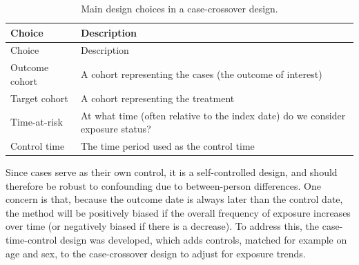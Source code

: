 \documentclass[11pt]{book}
\theoremstyle{definition}
\theoremstyle{definition}
\theoremstyle{definition}
\theoremstyle{remark}
\begin{document}
\begin{longtable}[]{@{}ll@{}}
\caption{\label{tab:ccrChoices} Main design choices in a case-crossover design.}\tabularnewline
\toprule
\begin{minipage}[b]{0.23\columnwidth}\raggedright
Choice\strut
\end{minipage} & \begin{minipage}[b]{0.72\columnwidth}\raggedright
Description\strut
\end{minipage}\tabularnewline
\midrule
\endfirsthead
\toprule
\begin{minipage}[b]{0.23\columnwidth}\raggedright
Choice\strut
\end{minipage} & \begin{minipage}[b]{0.72\columnwidth}\raggedright
Description\strut
\end{minipage}\tabularnewline
\midrule
\endhead
\begin{minipage}[t]{0.23\columnwidth}\raggedright
Outcome cohort\strut
\end{minipage} & \begin{minipage}[t]{0.72\columnwidth}\raggedright
A cohort representing the cases (the outcome of interest)\strut
\end{minipage}\tabularnewline
\begin{minipage}[t]{0.23\columnwidth}\raggedright
Target cohort\strut
\end{minipage} & \begin{minipage}[t]{0.72\columnwidth}\raggedright
A cohort representing the treatment\strut
\end{minipage}\tabularnewline
\begin{minipage}[t]{0.23\columnwidth}\raggedright
Time-at-risk\strut
\end{minipage} & \begin{minipage}[t]{0.72\columnwidth}\raggedright
At what time (often relative to the index date) do we consider exposure status?\strut
\end{minipage}\tabularnewline
\begin{minipage}[t]{0.23\columnwidth}\raggedright
Control time\strut
\end{minipage} & \begin{minipage}[t]{0.72\columnwidth}\raggedright
The time period used as the control time\strut
\end{minipage}\tabularnewline
\bottomrule
\end{longtable}

Since cases serve as their own control, it is a self-controlled design, and should therefore be robust to confounding due to between-person differences. One concern is that, because the outcome date is always later than the control date, the method will be positively biased if the overall frequency of exposure increases over time (or negatively biased if there is a decrease). To address this, the case-time-control design \citep{suissa_1995} was developed, which adds controls, matched for example on age and sex, to the case-crossover design to adjust for exposure trends.
\end{document}

